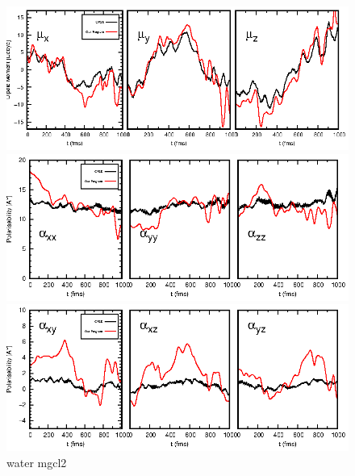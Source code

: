 \documentclass{article}
\begin{document}
\begin{figure}
	\centering
	\includegraphics[width=6.2in]{mgcl2-water/Fig1.eps}
	
	\includegraphics[width=6.2in]{mgcl2-water/Fig2.eps}
	
	\includegraphics[width=6.2in]{mgcl2-water/Fig3.eps}
		\caption{water mgcl2}
\end{figure}
\end{document}
